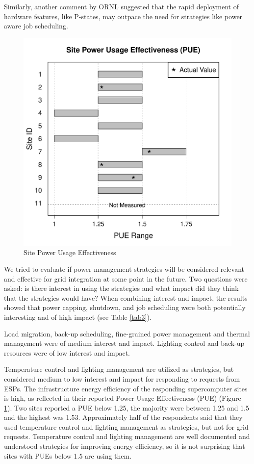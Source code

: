 Similarly, another comment by ORNL suggested that the rapid deployment of hardware features, like P-states,  may outpace the need for strategies like power aware job scheduling.

\begin{figure}
\begin{center}
\includegraphics[scale=0.45]{NewGraphs/PUE-Graph.pdf}
\caption{Site Power Usage Effectiveness}
\label{figPUE}
\end{center}
\end{figure}

We tried to evaluate if power management strategies will be considered
relevant and effective for grid integration at some point in the future. Two
questions were asked: is there interest in using the strategies and what
impact did they think that the strategies would have? When combining
interest and impact, the results showed that power capping, shutdown, and
job scheduling were both potentially interesting and of high impact (see Table \ref{tab3}). 

Load migration, back-up
scheduling, fine-grained power management and thermal management were of medium
interest and impact. Lighting control and back-up resources were of low
interest and impact. 

Temperature control and lighting management are utilized as strategies, but considered medium to low interest and impact
for responding to requests from ESPs. 
The infrastructure energy efficiency of the responding supercomputer sites is high, as reflected in their reported
Power Usage Effectiveness (PUE) (Figure \ref{figPUE}). Two sites reported a PUE below 1.25, the majority were between 
1.25 and 1.5 and the highest was 1.53. Approximately half of the respondents said that they used 
temperature control and lighting management
as strategies, but not for grid requests. Temperature control and lighting management are well documented and understood
strategies for improving energy efficiency, so it is not surprising that sites with PUEs below 1.5 are using them.

